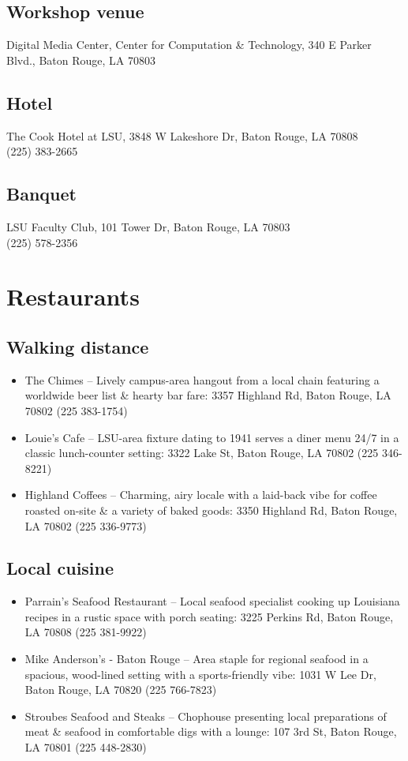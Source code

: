 \documentclass[12pt,letterpaper]{book}
\begin{document}
\subsection*{Workshop venue}
Digital Media Center, Center for Computation \& Technology, 340 E Parker Blvd., Baton Rouge, LA 70803
\subsection*{Hotel}
The Cook Hotel at LSU, 3848 W Lakeshore Dr, Baton Rouge, LA 70808 \\
(225) 383-2665
\subsection*{Banquet}
LSU Faculty Club, 101 Tower Dr, Baton Rouge, LA 70803 \\
(225) 578-2356

\section{Restaurants}

\subsection*{Walking distance}

\begin{itemize}
\item The Chimes -- Lively campus-area hangout from a local chain featuring a worldwide beer list \& hearty bar fare: 3357 Highland Rd, Baton Rouge, LA 70802 (225 383-1754)
\item Louie's Cafe -- LSU-area fixture dating to 1941 serves a diner menu 24/7 in a classic lunch-counter setting: 3322 Lake St, Baton Rouge, LA 70802 (225 346-8221)
\item Highland Coffees -- Charming, airy locale with a laid-back vibe for coffee roasted on-site \& a variety of baked goods: 3350 Highland Rd, Baton Rouge, LA 70802 (225 336-9773)
\end{itemize}

\subsection*{Local cuisine}

\begin{itemize}
\item Parrain's Seafood Restaurant -- Local seafood specialist cooking up Louisiana recipes in a rustic space with porch seating: 3225 Perkins Rd, Baton Rouge, LA 70808 (225 381-9922)
\item Mike Anderson's - Baton Rouge -- Area staple for regional seafood in a spacious, wood-lined setting with a sports-friendly vibe: 1031 W Lee Dr, Baton Rouge, LA 70820 (225 766-7823)
\item Stroubes Seafood and Steaks -- Chophouse presenting local preparations of meat \& seafood in comfortable digs with a lounge: 107 3rd St, Baton Rouge, LA 70801 (225 448-2830)
\end{itemize}


\backmatter
\renewcommand{\indexname}{Author Index}
\printindex
\vspace{2cm}
\doclicenseThis 
\end{document}
